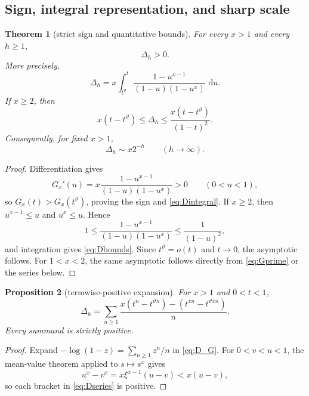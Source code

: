 \documentclass[11pt]{article}
\numberwithin{equation}{section}
\newtheorem{theorem}{Theorem}[section]
\newtheorem{proposition}[theorem]{Proposition}
\theoremstyle{definition}
\theoremstyle{remark}
\newcommand{\dd}{\,\mathrm d}
\begin{document}
\subsection{Sign, integral representation, and sharp scale}

\begin{theorem}[strict sign and quantitative bounds]\label{thm:sign}
For every $x>1$ and every $h\ge1$,
\begin{equation}\label{eq:Dpositive}
  \Delta_h>0.
\end{equation}
More precisely,
\begin{equation}\label{eq:Dintegral}
  \Delta_h
  =x\int_{t^\vartheta}^{t}
  \frac{1-u^{x-1}}{(1-u)(1-u^x)}\,\dd u.
\end{equation}
If $x\ge2$, then
\begin{equation}\label{eq:Dbounds}
  x(t-t^\vartheta)
  \le \Delta_h
  \le \frac{x(t-t^\vartheta)}{(1-t)^2}.
\end{equation}
Consequently, for fixed $x>1$,
\begin{equation}\label{eq:Dasymp}
  \Delta_h\sim x2^{-h}
  \qquad (h\to\infty).
\end{equation}
\end{theorem}

\begin{proof}
Differentiation gives
\begin{equation}\label{eq:Gprime}
  G_x'(u)
  =x\frac{1-u^{x-1}}{(1-u)(1-u^x)}>0
  \qquad(0<u<1),
\end{equation}
so $G_x(t)>G_x(t^\vartheta)$, proving the sign and \eqref{eq:Dintegral}.  If $x\ge2$, then $u^{x-1}\le u$ and $u^x\le u$.  Hence
\[
  1\le \frac{1-u^{x-1}}{(1-u)(1-u^x)}
  \le \frac1{(1-u)^2},
\]
and integration gives \eqref{eq:Dbounds}.  Since $t^\vartheta=o(t)$ and $t\to0$, the asymptotic follows.  For $1<x<2$, the same asymptotic follows directly from \eqref{eq:Gprime} or the series below.
\end{proof}

\begin{proposition}[termwise-positive expansion]\label{prop:series}
For $x>1$ and $0<t<1$,
\begin{equation}\label{eq:Dseries}
  \Delta_h
  =\sum_{n\ge1}\frac{
  x(t^n-t^{\vartheta n})-(t^{xn}-t^{\vartheta xn})}{n}.
\end{equation}
Every summand is strictly positive.
\end{proposition}

\begin{proof}
Expand $-\log(1-z)=\sum_{n\ge1}z^n/n$ in \eqref{eq:D_G}.  For $0<v<u<1$, the mean-value theorem applied to $s\mapsto s^x$ gives
\[
  u^x-v^x=x\xi^{x-1}(u-v)<x(u-v),
\]
so each bracket in \eqref{eq:Dseries} is positive.
\end{proof}
\end{document}
